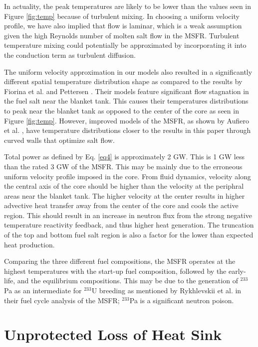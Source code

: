 \documentclass{anstrans}
\begin{document}
	In actuality, the peak temperatures are likely to be lower than the values
	seen in Figure \ref{fig:temp} because of turbulent mixing. In choosing a
	uniform velocity profile, we have also implied that flow is laminar, which
	is a weak assumption given the high Reynolds number of molten salt flow in
	the \gls{MSFR}. Turbulent temperature mixing could potentially be
	approximated by
	incorporating it into the conduction term as turbulent diffusion.
	
	The uniform velocity approximation in our models also resulted in a
	significantly different spatial temperature distribution shape as compared
	to
	the results by Fiorina et al. \cite{fiorina_modelling_2014} and Pettersen
	\cite{pettersen_coupled_2016}. Their models feature significant flow
	stagnation in the fuel salt
	near the blanket tank. This causes their temperatures distributions to peak
	near the blanket
	tank as opposed to the center of the core as seen in Figure \ref{fig:temp}.
	However, improved models of the \gls{MSFR}, as shown by Aufiero et al.
	\cite{aufiero_development_2014}, have temperature distributions closer to
	the results in this paper through curved walls that optimize salt flow.
	
	Total power as defined by Eq. \ref{eq4} is approximately 2 GW. This
	is 1 GW less than the rated 3 GW of the \gls{MSFR}. This may be mainly due
	to the erroneous uniform velocity profile imposed in the core. From
	fluid dynamics, velocity along the central axis of the core should be
	higher than the velocity at the periphral areas near the blanket tank.
	The higher velocity at the center results in higher advective heat transfer
	away from the center of the core and cools the active region. This should
	result in an increase in neutron flux from the strong negative
	temperature reactivity feedback, and thus higher heat generation. The
	truncation of the top and bottom fuel salt region is also a factor for
	the lower than expected heat production.
	
	Comparing the three different fuel compositions, the \gls{MSFR} operates at
	the highest temperatures with the start-up fuel composition, followed by
	the early-life, and the equilibrium compositions. This may be due to the
	generation of $^{233}$Pa as an intermediate for $^{233}$U breeding as
	mentioned by Rykhlevskii et al. \cite{rykhlevskii_fuel_2019} in their fuel
	cycle analysis
	of the \gls{MSFR}; $^{233}$Pa is a significant neutron poison.

\section{Unprotected Loss of Heat Sink}
\end{document}
